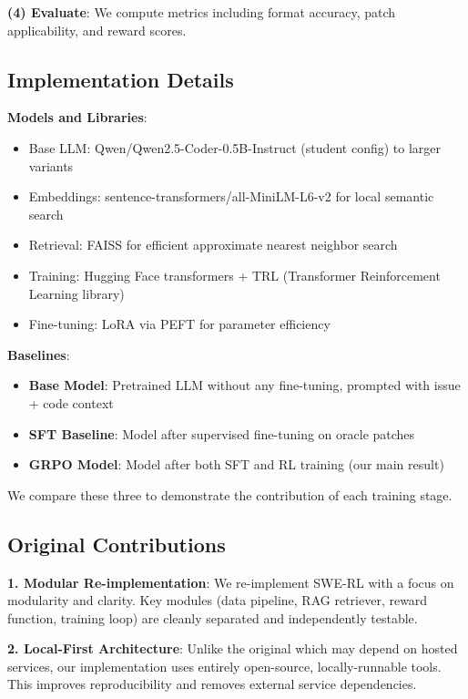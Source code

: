 \documentclass{article} %
\begin{document}
\textbf{(4) Evaluate}: We compute metrics including format accuracy, patch applicability, and reward scores.

\subsection{Implementation Details}

\textbf{Models and Libraries}:
\begin{itemize}
    \item Base LLM: Qwen/Qwen2.5-Coder-0.5B-Instruct (student config) to larger variants
    \item Embeddings: sentence-transformers/all-MiniLM-L6-v2 for local semantic search
    \item Retrieval: FAISS for efficient approximate nearest neighbor search
    \item Training: Hugging Face transformers + TRL (Transformer Reinforcement Learning library)
    \item Fine-tuning: LoRA via PEFT for parameter efficiency
\end{itemize}

\textbf{Baselines}:
\begin{itemize}
    \item \textbf{Base Model}: Pretrained LLM without any fine-tuning, prompted with issue + code context
    \item \textbf{SFT Baseline}: Model after supervised fine-tuning on oracle patches
    \item \textbf{GRPO Model}: Model after both SFT and RL training (our main result)
\end{itemize}

We compare these three to demonstrate the contribution of each training stage.

\subsection{Original Contributions}

\textbf{1. Modular Re-implementation}: We re-implement SWE-RL with a focus on modularity and clarity. Key modules (data pipeline, RAG retriever, reward function, training loop) are cleanly separated and independently testable.

\textbf{2. Local-First Architecture}: Unlike the original which may depend on hosted services, our implementation uses entirely open-source, locally-runnable tools. This improves reproducibility and removes external service dependencies.
\end{document}
